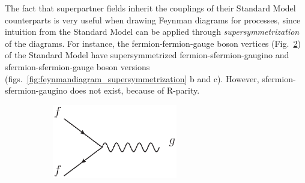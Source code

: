 \documentclass[twoside,english]{uiofysmaster}
\begin{document}
The fact that superpartner fields inherit the couplings of their Standard Model counterparts is very useful when drawing Feynman diagrams for processes, since intuition from the Standard Model can be applied through {\it supersymmetrization} of the diagrams. For instance, the fermion-fermion-gauge boson vertices (Fig.\ \ref{fig:feynmandiagram_supersymmetrization_a}) of the Standard Model have supersymmetrized fermion-sfermion-gaugino and sfermion-sfermion-gauge boson versions (figs.\ \ref{fig:feynmandiagram_supersymmetrization} b and c). However, sfermion-sfermion-gaugino does not exist, because of R-parity. 
 \begin{figure}[htbp]
	\centering
	\begin{subfigure}[b]{0.45\textwidth}
		\centering
		\includegraphics[width=0.6\textwidth]{figures/susyintro/ffg_vertex.eps}
		\caption{ }
		\label{fig:feynmandiagram_supersymmetrization_a}
	\end{subfigure}


\end{figure}
\end{document}
